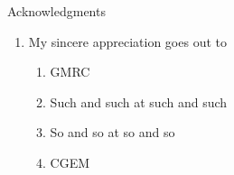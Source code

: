\documentclass[aspectratio=169]{beamer}
\begin{document}
  \begin{frame}{Acknowledgments}
    \vspace{-2cm}
    \begin{enumerate}
      \item My sincere appreciation goes out to
      \begin{enumerate}
        \item GMRC
        \item Such and such at such and such
        \item So and so at so and so
        \item CGEM 
      \end{enumerate}
    \end{enumerate}
  \end{frame}

  \questionslide
  
\end{document}
